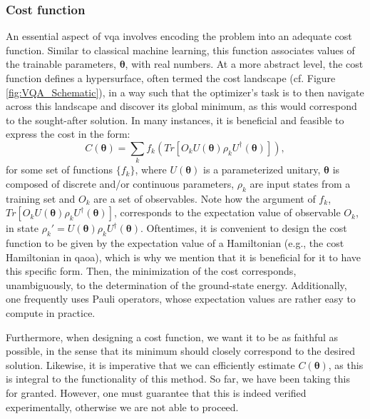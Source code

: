 \subsubsection*{\small Cost function}
An essential aspect of \acrshort{vqa} involves encoding the problem into an adequate cost function. Similar to classical machine learning, this function associates values of the trainable parameters, $\boldsymbol{\theta}$, with real numbers. At a more abstract level, the cost function defines a hypersurface, often termed the cost landscape (cf. Figure \ref{fig:VQA_Schematic}), in a way such that the optimizer's task is to then navigate across this landscape and discover its global minimum, as this would correspond to the sought-after solution. In many instances, it is beneficial and feasible to express the cost in the form:
\begin{equation}\label{eq:Cost}
    C(\boldsymbol{\theta}) = \sum_k f_k\left( Tr\left[O_k U(\boldsymbol{\theta}) \rho_k U^{\dagger}(\boldsymbol{\theta})\right] \right),
\end{equation}
for some set of functions $\{f_k\}$, where $U(\boldsymbol{\theta})$ is a parameterized unitary, $\boldsymbol{\theta}$ is composed of discrete and/or continuous parameters, $\rho_k$ are input states from a training set and $O_k$ are a set of observables. Note how the argument of $f_k$, $Tr\left[O_k U(\boldsymbol{\theta}) \rho_k U^{\dagger}(\boldsymbol{\theta})\right]$, corresponds to the expectation value of observable $O_k$, in state $\rho_k' = U(\boldsymbol{\theta}) \rho_k U^{\dagger}(\boldsymbol{\theta})$. Oftentimes, it is convenient to design the cost function to be given by the expectation value of a Hamiltonian (e.g., the cost Hamiltonian in \acrshort{qaoa}), which is why we mention that it is beneficial for it to have this specific form. Then, the minimization of the cost corresponds, unambiguously, to the determination of the ground-state energy. Additionally, one frequently uses Pauli operators, whose expectation values are rather easy to compute in practice.

Furthermore, when designing a cost function, we want it to be as faithful as possible, in the sense that its minimum should closely correspond to the desired solution. Likewise, it is imperative that we can efficiently estimate $C(\boldsymbol{\theta})$, as this is integral to the functionality of this method. So far, we have been taking this for granted. However, one must guarantee that this is indeed verified experimentally, otherwise we are not able to proceed.

